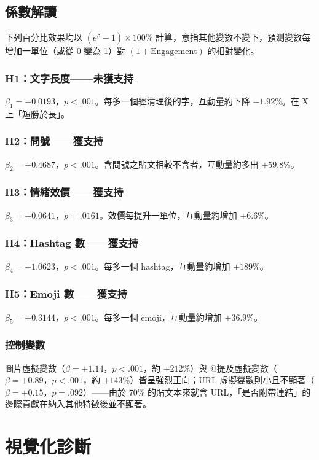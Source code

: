 \documentclass[12pt,a4paper]{ctexart}
\begin{document}
\subsection{係數解讀}

下列百分比效果均以 $(e^{\beta}-1)\times 100\%$ 計算，意指其他變數不變下，預測變數每增加一單位（或從 0 變為 1）對 $(1+\text{Engagement})$ 的相對變化。

\subsubsection*{H1：文字長度——未獲支持}
$\beta_1 = -0.0193$，$p<.001$。每多一個經清理後的字，互動量約下降 $-1.92\%$。在 X 上「短勝於長」。

\subsubsection*{H2：問號——獲支持}
$\beta_2 = +0.4687$，$p<.001$。含問號之貼文相較不含者，互動量約多出 $+59.8\%$。

\subsubsection*{H3：情緒效價——獲支持}
$\beta_3 = +0.0641$，$p=.0161$。效價每提升一單位，互動量約增加 $+6.6\%$。

\subsubsection*{H4：Hashtag 數——獲支持}
$\beta_4 = +1.0623$，$p<.001$。每多一個 hashtag，互動量約增加 $+189\%$。

\subsubsection*{H5：Emoji 數——獲支持}
$\beta_5 = +0.3144$，$p<.001$。每多一個 emoji，互動量約增加 $+36.9\%$。

\subsubsection*{控制變數}
圖片虛擬變數（$\beta=+1.14$，$p<.001$，約 $+212\%$）與 @提及虛擬變數（$\beta=+0.89$，$p<.001$，約 $+143\%$）皆呈強烈正向；URL 虛擬變數則小且不顯著（$\beta=+0.15$，$p=.092$）——由於 70\% 的貼文本來就含 URL，「是否附帶連結」的邊際貢獻在納入其他特徵後並不顯著。

\newpage

\section{視覺化診斷}
\end{document}
